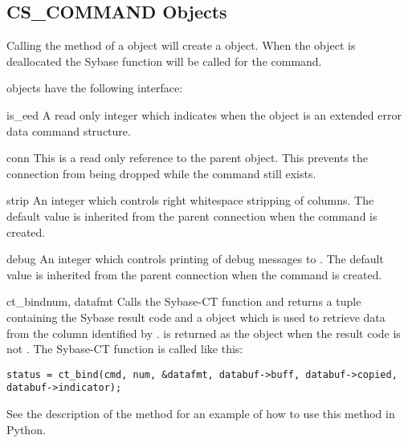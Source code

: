 \subsection{CS_COMMAND Objects}

Calling the  method of a 
object will create a  object.  When the
 object is deallocated the Sybase
 function will be called for the command.

 objects have the following interface:

\begin{memberdesc}[CS_COMMAND]{is_eed}
A read only integer which indicates when the  object
is an extended error data command structure.
\end{memberdesc}

\begin{memberdesc}[CS_COMMAND]{conn}
This is a read only reference to the parent 
object.  This prevents the connection from being dropped while the
command still exists.
\end{memberdesc}

\begin{memberdesc}[CS_COMMAND]{strip}
An integer which controls right whitespace stripping of 
columns.  The default value is inherited from the parent connection
when the command is created.
\end{memberdesc}

\begin{memberdesc}[CS_COMMAND]{debug}
An integer which controls printing of debug messages to .
The default value is inherited from the parent connection when the
command is created.
\end{memberdesc}

\begin{methoddesc}[CS_COMMAND]{ct_bind}{num, datafmt}
Calls the Sybase-CT  function and returns a tuple
containing the Sybase result code and a  object which
is used to retrieve data from the column identified by .
 is returned as the  object when the result
code is not .  The Sybase-CT 
function is called like this:

\begin{verbatim}
status = ct_bind(cmd, num, &datafmt, databuf->buff, databuf->copied, databuf->indicator);
\end{verbatim}

See the description of the  method for an
example of how to use this method in Python.
\end{methoddesc}

